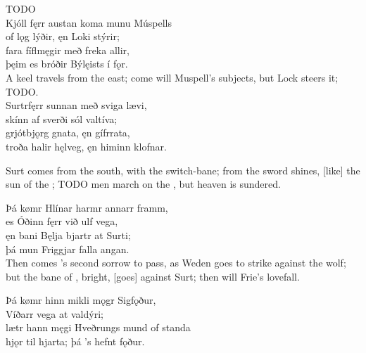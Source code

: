 \bvb TODO\\%

\bva Kjóll fęrr austan \hld koma munu Múspells \\%
of lǫg lýðir, \hld ęn Loki stýrir; \\%
fara fíflmęgir \hld með freka allir, \\%
þęim es bróðir \hld Býlęists í fǫr.\\%

\bvb A keel travels from the east; come will Muspell’s subjects, but Lock steers it; TODO.\\%

\bva Surtr\footnotemark[1] fęrr sunnan \hld með sviga lævi, \\%
skínn af sverði \hld sól valtíva; \\%
grjótbjǫrg gnata, \hld ęn gífr\footnotemark[2] rata, \\%
troða halir hęlveg, \hld ęn himinn klofnar.\\%

\bvb Surt comes from the south, with the switch-bane\footnotemark[1]; from the sword shines, [like] the sun of the ; TODO men march on the , but heaven is sundered.\footnotemark[2]\\%

\bva Þá kømr Hlínar \hld harmr annarr framm, \\%
es Óðinn fęrr \hld við ulf vega, \\%
ęn bani Bęlja \hld bjartr at Surti; \\%
þá mun Friggjar \hld falla angan.\\%

\bvb Then comes ’s second sorrow to pass, as Weden goes to strike against the wolf; but the bane of \footnotemark[1], bright, [goes] against Surt; then will Frie’s love\footnotemark[2] fall.\\%

\bva Þá kømr hinn mikli \hld mǫgr Sigfǫður, \\%
Víðarr vega \hld at valdýri; \\%
lætr hann męgi Hveðrungs \hld mund of standa \\%
hjǫr til hjarta; \hld þá ’s hefnt fǫður.\\%

